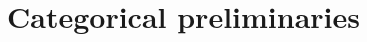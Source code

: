 \documentclass[12pt]{article}
\newtheorem{remark}{Remark}
\newtheorem{proposition}{Proposition}
\newcommand{\pietro}[1]{\textcolor{teal}{#1}}
\newcommand{\Hom}{{\textnormal{Hom}}}
\newcommand{\Obj}{{\textnormal{Obj}}}
\newcommand{\Cat}{{\mathbf{C}}}
\begin{document}

  



    \section{Categorical preliminaries}
\end{document}
